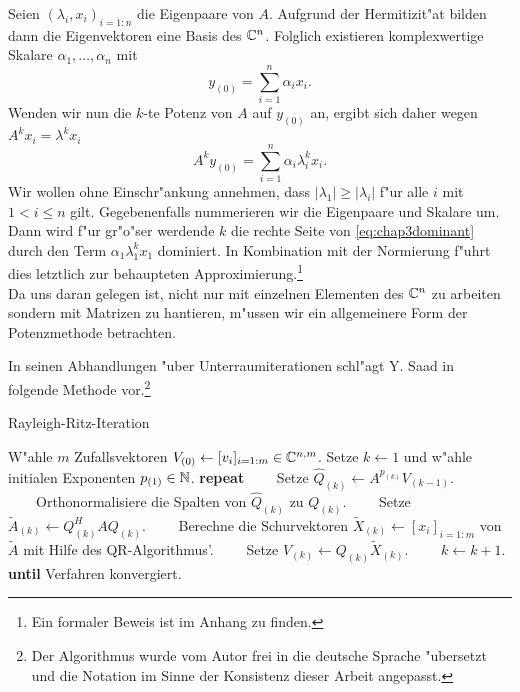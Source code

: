 Seien $(\lambda_i, x_i)_{i=1:n}$ die Eigenpaare von $A$. Aufgrund der Hermitizit"at bilden dann die Eigenvektoren eine Basis des $\mathbb{C}^n$.
Folglich existieren komplexwertige Skalare $\alpha_1,\ldots,\alpha_n$ mit
\[
y_{(0)} = \sum_{i=1}^n \alpha_i x_i.
\]
Wenden wir nun die $k$-te Potenz von $A$ auf $y_{(0)}$ an, ergibt sich daher wegen $A^k x_i = \lambda^k x_i$
\begin{equation}\label{eq:chap3dominant}
A^k y_{(0)} = \sum_{i=1}^n \alpha_i \lambda_i^k x_i.
\end{equation}
Wir wollen ohne Einschr"ankung annehmen, dass $|\lambda_1| \ge |\lambda_i|$ f"ur alle $i$ mit
$1<i\le n$ gilt. Gegebenenfalls nummerieren wir die Eigenpaare und Skalare um. Dann wird f"ur gr"o"ser werdende $k$ die rechte Seite von \eqref{eq:chap3dominant} durch den Term $\alpha_1 \lambda_1^k x_1$ dominiert. In Kombination mit der Normierung f"uhrt dies letztlich
zur behaupteten Approximierung.\footnote{Ein formaler Beweis ist im Anhang zu finden.}\\

Da uns daran gelegen ist, nicht nur mit einzelnen Elementen des $\mathbb{C}^n$ zu arbeiten sondern mit Matrizen zu hantieren, m"ussen wir ein allgemeinere Form der Potenzmethode betrachten.

In seinen Abhandlungen "uber Unterraumiterationen
schl"agt Y. Saad in ~\cite[118 f.]{saad} folgende Methode vor.\footnote{Der Algorithmus wurde vom Autor frei in die deutsche Sprache "ubersetzt und die Notation im Sinne der Konsistenz dieser Arbeit angepasst.}

\begin{algorithm}\label{alg:chap3rriter}
\caption{Rayleigh-Ritz-Iteration}\label{euclid}
\begin{algorithmic}[1]
\State W"ahle $m$ Zufallsvektoren $V_{(0)} \gets [v_i]_{i=1:m} \in\mathbb{C}^{n,m}$.
Setze $k \gets 1$ und w"ahle initialen Exponenten $p_{(1)} \in\mathbb{N}$.
\State \textbf{repeat}
\State \ \ \ \ Setze $\hat{Q}_{(k)} \gets A^{p_{(k)}} V_{(k-1)}$.
\State \ \ \ \ Orthonormalisiere die Spalten von $\hat{Q}_{(k)}$ zu $Q_{(k)}$.
\State \ \ \ \ Setze $\widetilde{A}_{(k)} \gets Q_{(k)}^H A Q_{(k)}$.
\State \ \ \ \ Berechne die Schurvektoren $\widetilde{X}_{(k)} \gets [x_i]_{i=1:m}$ von $\widetilde{A}$ mit Hilfe des QR-Algorithmus'.
\State \ \ \ \ Setze $V_{(k)} \gets Q_{(k)}\widetilde{X}_{(k)}$.
\State \ \ \ \ $k \gets k+1$.
\State \textbf{until} Verfahren konvergiert.
\end{algorithmic}
\end{algorithm}

